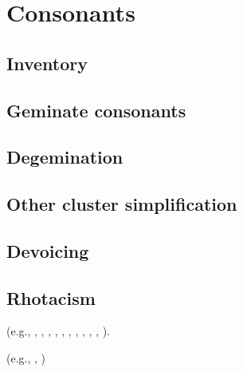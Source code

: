 \chapter{Consonants}

\section{Inventory}

\citet{Allen1978}

\citet{Steriade1995}

\section{Geminate consonants}


\section{Degemination}

\section{Other cluster simplification}

\citet{Heslin1987}

\section{Devoicing}

\citet{Allen1978}

\section{Rhotacism}

\citet{Saussure1877}


(e.g., \citealt{Albright2005}, \citealt[62]{Foley1965}, \citealt{Gruber2006}, \citealt[134]{Heslin1987}, \citealt[377]{Kenstowicz1996}, \citealt{KiparskyInPress}, \citealt[314]{Klausenburger1976}, \citealt[19]{Matthews1972a}, \citealt{Roberts2012}, \citealt{Touratier1975}, \citealt{Watkins1970}).

(e.g., \citealt[73]{Embick2010}, \citealt{Halle1998a})

